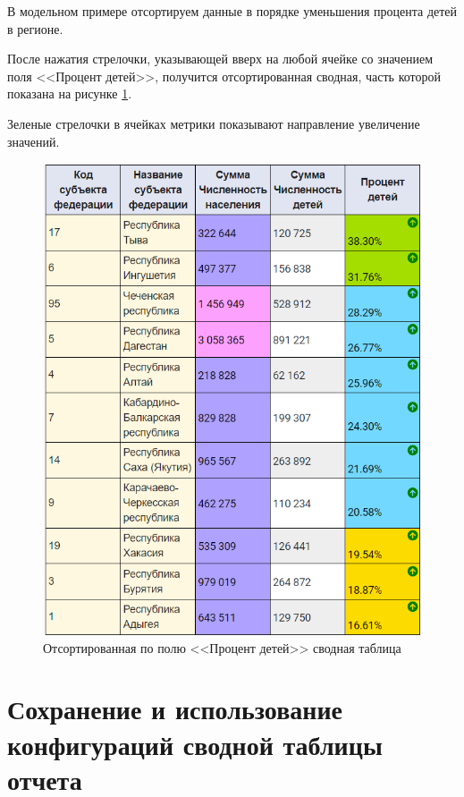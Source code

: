 \documentclass[../user-manual.tex]{subfiles}
\begin{document}
	\begin{modelExample}
		В модельном примере отсортируем данные в порядке уменьшения процента детей в регионе.
		
		После нажатия стрелочки, указывающей вверх на любой ячейке со значением поля <<Процент детей>>, получится отсортированная сводная, часть которой показана на рисунке \ref{fig:sorted-pivot}. 
		
		Зеленые стрелочки в ячейках метрики показывают направление увеличение значений.
	
	\end{modelExample}

	\begin{figure}[h]
		\centering
		\includegraphics[width=\graphicswidth]{img/25-sort-pivot.png}
		\caption{Отсортированная по полю <<Процент детей>> сводная таблица}
		\label{fig:sorted-pivot}
	\end{figure}
	
		
	\section{Сохранение и использование конфигураций сводной таблицы отчета}
	
\end{document}
